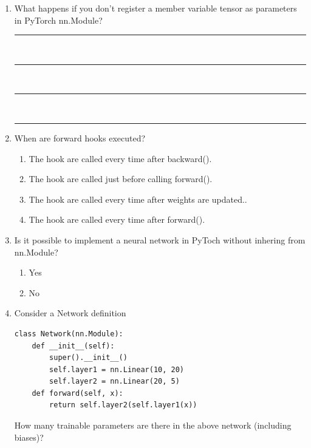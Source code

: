 \documentclass[11pt, xcolor=dvipsnames,svgnames,x11names]{article}
\renewcommand{\texttt}[1]{{\ttfamily\color{headerRed}#1}}
\begin{document}
\begin{enumerate}
\item What happens if you don't register a member variable tensor as parameters in PyTorch \texttt{nn.Module}?

\begin{tcolorbox}[colback=white, colframe=headerRed!75!black]
\vspace{1.5em}
\noindent\rule{\textwidth}{0.4pt}\\[1.5em]
\noindent\rule{\textwidth}{0.4pt}\\[1.5em]
\noindent\rule{\textwidth}{0.4pt}\\[1.5em]
\noindent\rule{\textwidth}{0.4pt}
\vspace{0.5em}
\end{tcolorbox}


\item When are forward hooks executed?

\begin{enumerate}
\item The hook are called every time after \texttt{backward()}.
\item The hook are called just before calling \texttt{forward()}.
\item The hook are called every time after weights are updated..
\item The hook are called every time after \texttt{forward()}.
\end{enumerate}

\item Is it possible to implement a neural network in PyToch without inhering from \texttt{nn.Module}?

\begin{enumerate}
\item Yes
\item No
\end{enumerate}


\item Consider a Network definition 

          \begin{verbatim}
class Network(nn.Module):
	def __init__(self):
		super().__init__()
		self.layer1 = nn.Linear(10, 20)
		self.layer2 = nn.Linear(20, 5)
	def forward(self, x):
		return self.layer2(self.layer1(x))
\end{verbatim}

How many trainable parameters are there in the above network (including biases)?


\end{enumerate}
\end{document}
